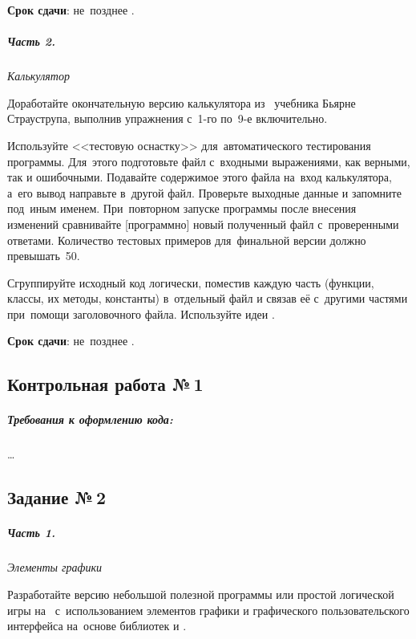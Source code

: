 \documentclass[a4paper,11pt,landscape,notitlepage,oneside,openany,final]{memoir}
\begin{document}
\medskip

\textbf{Срок сдачи}: не~позднее .



\subparagraph{Часть 2.}
\textit{Калькулятор}

Доработайте окончательную версию калькулятора из~ учебника Бьярне Страуструпа, выполнив упражнения с~1-го по~9-е включительно.

Используйте <<тестовую оснастку>> для~автоматического тестирования программы. Для~этого подготовьте файл с~входными выражениями, как верными, так и ошибочными. Подавайте содержимое этого файла на~вход калькулятора, а~его вывод направьте в~другой файл. Проверьте выходные данные и запомните под~иным именем. При~повторном запуске программы после внесения изменений сравнивайте [программно] новый полученный файл с~проверенными ответами. Количество тестовых примеров для~финальной версии должно превышать~50.

Сгруппируйте исходный код логически, поместив каждую часть (функции, классы, их методы, константы) в~отдельный файл и связав её с~другими частями при~помощи заголовочного файла. Используйте идеи .

\medskip

\textbf{Срок сдачи}: не~позднее .



\subsection{Контрольная работа №\,1}
\subparagraph{Требования к оформлению кода:}
\ldots



\subsection{Задание №\,2}
\subparagraph{Часть 1.}
\textit{Элементы графики}

Разработайте версию небольшой полезной программы или простой логической игры на~ с~использованием элементов графики и графического пользовательского интерфейса на~основе библиотек  и .
\end{document}
